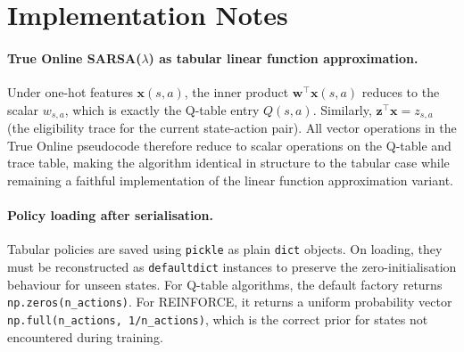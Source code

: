 \section{Implementation Notes}
\label{app:implementation}

\paragraph{True Online SARSA($\lambda$) as tabular linear function approximation.}
Under one-hot features $\mathbf{x}(s,a)$, the inner product $\mathbf{w}^\top \mathbf{x}(s,a)$ reduces to the scalar $w_{s,a}$, which is exactly the Q-table entry $Q(s,a)$. Similarly, $\mathbf{z}^\top \mathbf{x} =
z_{s,a}$ (the eligibility trace for the current state-action pair). All vector
operations in the True Online pseudocode therefore reduce to scalar operations on the Q-table and trace table, making the algorithm identical in structure to the tabular case while remaining a faithful implementation of the linear function approximation variant.

\paragraph{Policy loading after serialisation.}
Tabular policies are saved using \texttt{pickle} as plain \texttt{dict} objects. On loading, they must be reconstructed as \texttt{defaultdict} instances to preserve the zero-initialisation behaviour for unseen states. For Q-table algorithms, the default factory returns \texttt{np.zeros(n\_actions)}. For REINFORCE, it returns a uniform probability vector
\texttt{np.full(n\_actions, 1/n\_actions)}, which is the correct prior for states not encountered during training.